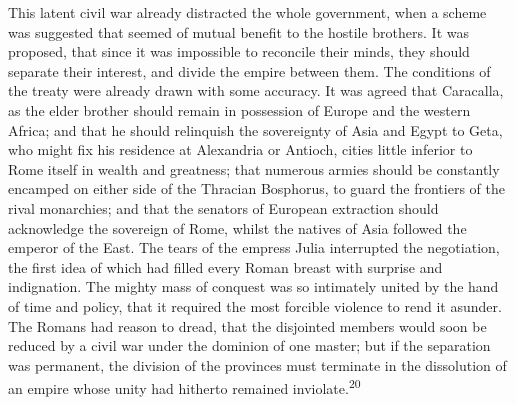 This latent civil war already distracted the whole government,
when a scheme was suggested that seemed of mutual benefit to the
hostile brothers. It was proposed, that since it was impossible
to reconcile their minds, they should separate their interest,
and divide the empire between them. The conditions of the treaty
were already drawn with some accuracy. It was agreed that
Caracalla, as the elder brother should remain in possession of
Europe and the western Africa; and that he should relinquish the
sovereignty of Asia and Egypt to Geta, who might fix his
residence at Alexandria or Antioch, cities little inferior to
Rome itself in wealth and greatness; that numerous armies should
be constantly encamped on either side of the Thracian Bosphorus,
to guard the frontiers of the rival monarchies; and that the
senators of European extraction should acknowledge the sovereign
of Rome, whilst the natives of Asia followed the emperor of the
East. The tears of the empress Julia interrupted the negotiation,
the first idea of which had filled every Roman breast with
surprise and indignation. The mighty mass of conquest was so
intimately united by the hand of time and policy, that it
required the most forcible violence to rend it asunder. The
Romans had reason to dread, that the disjointed members would
soon be reduced by a civil war under the dominion of one master;
but if the separation was permanent, the division of the
provinces must terminate in the dissolution of an empire whose
unity had hitherto remained inviolate.\textsuperscript{20}


